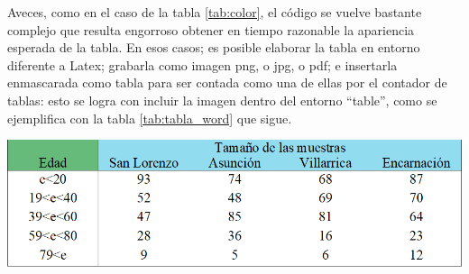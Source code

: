 Aveces, como en el caso de la tabla \ref{tab:color}, el código se vuelve bastante complejo que resulta engorroso obtener en tiempo razonable la apariencia esperada de la tabla. En esos casos; es posible elaborar la tabla en entorno diferente a Latex; grabarla como imagen png, o jpg, o pdf; e insertarla enmascarada como tabla para ser contada como una de ellas por el contador de tablas: esto se logra con incluir la imagen dentro del entorno ``table'', como se ejemplifica con la tabla \ref{tab:tabla_word} que sigue.

\begin{table}[H]
	\begin{center}
		\label{tab:tabla_word}
		\includegraphics[scale=.65]{./capitulo_04/tabla_word.png}
	\end{center}
\end{table}

